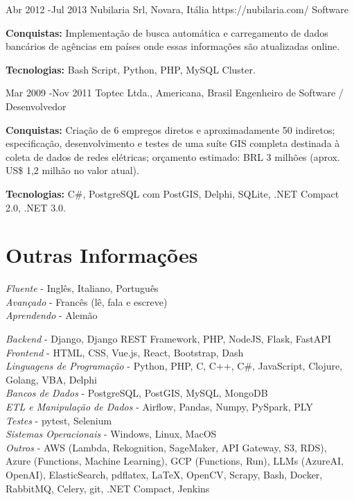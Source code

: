 \documentclass[10pt]{article} %
\begin{document}
\job
{Abr 2012 -}{Jul 2013}
{Nubilaria Srl, Novara, Itália}
{https://nubilaria.com/}
{Software}
{\rule{0mm}{2mm}\textbf{Conquistas:} Implementação de busca automática e carregamento de dados bancários de agências em países onde essas informações são atualizadas online.\\
\rule{0mm}{3mm}\textbf{Tecnologias:} Bash Script, Python, PHP, MySQL Cluster.}


\job
{Mar 2009 -}{Nov 2011}
{Toptec Ltda., Americana, Brasil}
{}
{Engenheiro de Software / Desenvolvedor}
{\rule{0mm}{2mm}\textbf{Conquistas:} Criação de 6 empregos diretos e aproximadamente 50 indiretos; especificação, desenvolvimento e testes de uma suíte GIS completa destinada à coleta de dados de redes elétricas; orçamento estimado: BRL 3 milhões (aprox. US\$ 1,2 milhão no valor atual).\\
\rule{0mm}{3mm}\textbf{Tecnologias:} C\#, PostgreSQL com PostGIS, Delphi, SQLite, .NET Compact 2.0, .NET 3.0.}



\section{Outras Informações}

{
\textit{Fluente} - Inglês, Italiano, Português\\
\textit{Avançado} - Francês (lê, fala e escreve)\\
\textit{Aprendendo} - Alemão\\
}


{
\textit{Backend} - Django, Django REST Framework, PHP, NodeJS, Flask, FastAPI\\
\textit{Frontend} - HTML, CSS, Vue.js, React, Bootstrap, Dash\\
\textit{Linguagens de Programação} - Python, PHP, C, C++, C\#, JavaScript, Clojure, Golang, VBA, Delphi\\
\textit{Bancos de Dados} - PostgreSQL, PostGIS, MySQL, MongoDB\\
\textit{ETL e Manipulação de Dados} - Airflow, Pandas, Numpy, PySpark, PLY\\
\textit{Testes} - pytest, Selenium\\
\textit{Sistemas Operacionais} - Windows, Linux, MacOS\\
\textit{Outros} - AWS (Lambda, Rekognition, SageMaker, API Gateway, S3, RDS), Azure (Functions, Machine Learning), GCP (Functions, Run), LLMs (AzureAI, OpenAI), ElasticSearch, pdflatex, LaTeX, OpenCV, Scrapy, Bash, Docker, RabbitMQ, Celery, git, .NET Compact, Jenkins\\
}
\end{document}

